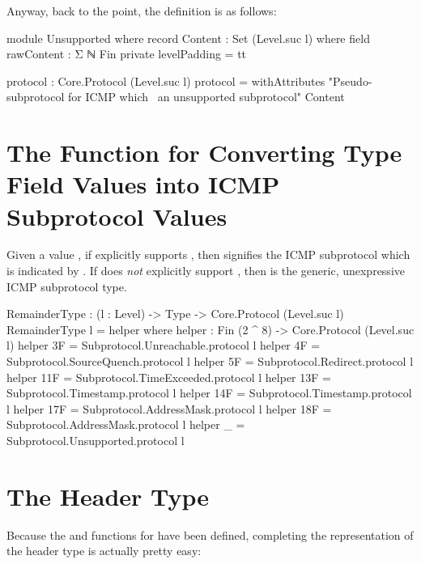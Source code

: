 \documentclass{report}
\begin{document}
\begin{itemize}
Anyway, back to the point, the definition is as follows:

\begin{code}
    module Unsupported where
      record Content : Set (Level.suc l) where
        field
          rawContent : Σ ℕ Fin
        private
          levelPadding = tt

      protocol : Core.Protocol (Level.suc l)
      protocol = withAttributes "Pseudo-subprotocol for ICMP which \
                                \represents an unsupported subprotocol"
                                Content
\end{code}

\section{The Function for Converting Type Field Values into ICMP Subprotocol Values}
Given a \AgdaField{Type} value , if  explicitly supports \AgdaBound{type}, then \AgdaFunction{RemainderType} \AgdaUnderscore{}  signifies the ICMP subprotocol which is indicated by .  If  does \emph{not} explicitly support , then  is the generic, unexpressive ICMP subprotocol type.

\begin{code}
  RemainderType  : (l : Level)
                -> Type
                -> Core.Protocol (Level.suc l)
  RemainderType l = helper
    where
    helper : Fin (2 ^ 8) -> Core.Protocol (Level.suc l)
    helper 3F = Subprotocol.Unreachable.protocol l
    helper 4F = Subprotocol.SourceQuench.protocol l
    helper 5F = Subprotocol.Redirect.protocol l
    helper 11F = Subprotocol.TimeExceeded.protocol l
    helper 13F = Subprotocol.Timestamp.protocol l
    helper 14F = Subprotocol.Timestamp.protocol l
    helper 17F = Subprotocol.AddressMask.protocol l
    helper 18F = Subprotocol.AddressMask.protocol l
    helper _ = Subprotocol.Unsupported.protocol l
\end{code}

\section{The Header Type}
Because the  and  functions for  have been defined, completing the representation of the header type is actually pretty easy:


\end{itemize}
\end{document}
